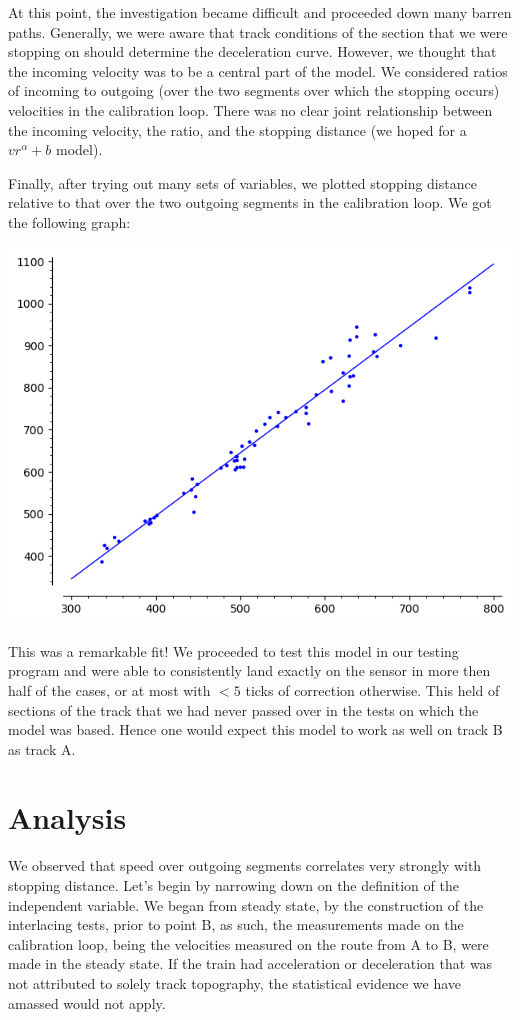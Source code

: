 \documentclass{amsart}
\begin{document}
At this point, the investigation became difficult and proceeded down many barren paths. Generally, we were aware that track conditions of the section that we were stopping on should determine the deceleration curve. However, we thought that the incoming velocity was to be a central part of the model. We considered ratios of incoming to outgoing (over the two segments over which the stopping occurs) velocities in the calibration loop. There was no clear joint relationship between the incoming velocity, the ratio, and the stopping distance (we hoped for a $vr^\alpha+b$ model).

\clearpage

Finally, after trying out many sets of variables, we plotted stopping distance relative to that over the two outgoing segments in the calibration loop. We got the following graph:
\begin{center}
\includegraphics[scale=0.5]{solution}
\end{center}
This was a remarkable fit! We proceeded to test this model in our testing program and were able to consistently land exactly on the sensor in more then half of the cases, or at most with $<5$ ticks of correction otherwise. This held of sections of the track that we had never passed over in the tests on which the model was based. Hence one would expect this model to work as well on track B as track A.

\section*{Analysis}

We observed that speed over outgoing segments correlates very strongly with stopping distance. Let's begin by narrowing down on the definition of the independent variable. We began from steady state, by the construction of the interlacing tests, prior to point B, as such, the measurements made on the calibration loop, being the velocities measured on the route from A to B, were made in the steady state. If the train had acceleration or deceleration that was not attributed to solely track topography, the statistical evidence we have amassed would not apply.
\end{document}
